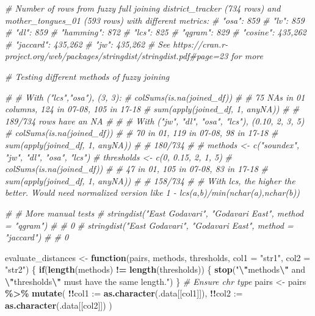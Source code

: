 \documentclass[
]{article}
\newenvironment{Shaded}{\begin{snugshade}}{\end{snugshade}}
\newcommand{\AttributeTok}[1]{\textcolor[rgb]{0.13,0.29,0.53}{#1}}
\newcommand{\CommentTok}[1]{\textcolor[rgb]{0.56,0.35,0.01}{\textit{#1}}}
\newcommand{\ControlFlowTok}[1]{\textcolor[rgb]{0.13,0.29,0.53}{\textbf{#1}}}
\newcommand{\FunctionTok}[1]{\textcolor[rgb]{0.13,0.29,0.53}{\textbf{#1}}}
\newcommand{\NormalTok}[1]{#1}
\newcommand{\OtherTok}[1]{\textcolor[rgb]{0.56,0.35,0.01}{#1}}
\newcommand{\SpecialCharTok}[1]{\textcolor[rgb]{0.81,0.36,0.00}{\textbf{#1}}}
\newcommand{\StringTok}[1]{\textcolor[rgb]{0.31,0.60,0.02}{#1}}
\begin{document}
\begin{Shaded}
\begin{Highlighting}[]
\CommentTok{\# Number of rows from fuzzy full joining district\_tracker (734 rows) and mother\_tongues\_01 (593 rows) with different metrics:}
\CommentTok{\# "osa": 859}
\CommentTok{\# "lv": 859}
\CommentTok{\# "dl": 859}
\CommentTok{\# "hamming": 872}
\CommentTok{\# "lcs": 825}
\CommentTok{\# "qgram": 829}
\CommentTok{\# "cosine": 435,262}
\CommentTok{\# "jaccard": 435,262}
\CommentTok{\# "jw": 435,262}
\CommentTok{\# See https://cran.r{-}project.org/web/packages/stringdist/stringdist.pdf\#page=23 for more}



\CommentTok{\# Testing different methods of fuzzy joining}

\CommentTok{\# \# With ("lcs","osa"), (3, 3):}
\CommentTok{\# colSums(is.na(joined\_df))}
\CommentTok{\# \# 75 NAs in 01 columns, 124 in 07{-}08, 105 in 17{-}18}
\CommentTok{\# sum(apply(joined\_df, 1, anyNA))}
\CommentTok{\# \# 189/734 rows have an NA}
\CommentTok{\# }
\CommentTok{\# \# With ("jw", "dl", "osa", "lcs"), (0.10, 2, 3, 5)}
\CommentTok{\# colSums(is.na(joined\_df))}
\CommentTok{\# \# 70 in 01, 119 in 07{-}08, 98 in 17{-}18}
\CommentTok{\# sum(apply(joined\_df, 1, anyNA))}
\CommentTok{\# \# 180/734}
\CommentTok{\# }
\CommentTok{\# methods \textless{}{-} c("soundex", "jw", "dl", "osa", "lcs")}
\CommentTok{\# thresholds \textless{}{-} c(0, 0.15, 2, 1, 5)}
\CommentTok{\# colSums(is.na(joined\_df))}
\CommentTok{\# \# 47 in 01, 105 in 07{-}08, 83 in 17{-}18}
\CommentTok{\# sum(apply(joined\_df, 1, anyNA))}
\CommentTok{\# \# 158/734}
\CommentTok{\# \# With lcs, the higher the better. Would need normalized version like 1 {-} lcs(a,b)/min(nchar(a),nchar(b))}


\CommentTok{\# \# More manual tests }
\CommentTok{\# stringdist("East Godavari", "Godavari East", method = "qgram")}
\CommentTok{\# \# 0}
\CommentTok{\# stringdist("East Godavari", "Godavari East", method = "jaccard")}
\CommentTok{\# \# 0}


\NormalTok{evaluate\_distances }\OtherTok{\textless{}{-}} \ControlFlowTok{function}\NormalTok{(pairs,}
\NormalTok{                               methods, thresholds,}
                               \AttributeTok{col1 =} \StringTok{"str1"}\NormalTok{, }\AttributeTok{col2 =} \StringTok{"str2"}\NormalTok{) \{}
  \ControlFlowTok{if}\NormalTok{(}\FunctionTok{length}\NormalTok{(methods) }\SpecialCharTok{!=} \FunctionTok{length}\NormalTok{(thresholds)) \{}
    \FunctionTok{stop}\NormalTok{(}\StringTok{"}\SpecialCharTok{\textbackslash{}"}\StringTok{methods}\SpecialCharTok{\textbackslash{}"}\StringTok{ and }\SpecialCharTok{\textbackslash{}"}\StringTok{thresholds}\SpecialCharTok{\textbackslash{}"}\StringTok{ must have the same length."}\NormalTok{)}
\NormalTok{  \}}
  \CommentTok{\# Ensure chr type}
\NormalTok{  pairs }\OtherTok{\textless{}{-}}\NormalTok{ pairs }\SpecialCharTok{\%\textgreater{}\%}
    \FunctionTok{mutate}\NormalTok{(}
      \SpecialCharTok{!!}\AttributeTok{col1 :=} \FunctionTok{as.character}\NormalTok{(.data[[col1]]),}
      \SpecialCharTok{!!}\AttributeTok{col2 :=} \FunctionTok{as.character}\NormalTok{(.data[[col2]])}
\NormalTok{    )}
  

\end{Highlighting}
\end{Shaded}
\end{document}
